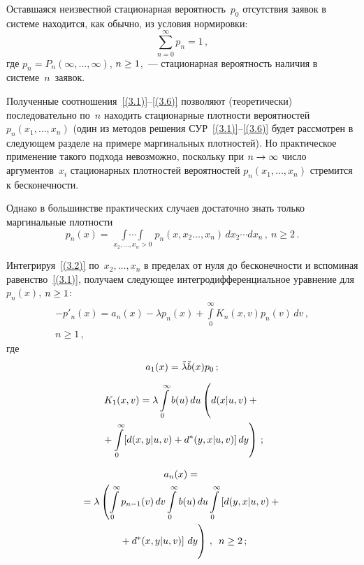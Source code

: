 \begin{multicols}{2}
Оставшаяся неизвестной стационарная
вероятность~$p_0$ отсутствия заявок в системе
находится, как обычно, из условия нормировки:
\begin{equation}
\label{(3.6)}
\sum\limits_{n=0}^\infty p_n = 1\,,
\end{equation}
где
$p_n=P_n(\infty,\ldots,\infty)$, $n\hm\ge1$,~---
стационарная вероятность наличия в системе~$n$~заявок.

Полученные соотношения~\eqref{(3.1)}--\eqref{(3.6)} позволяют
(теоретически) последовательно по~$n$
находить стационарные плотности вероятностей
$p_n(x_1,\ldots,x_{n})$ (один из методов
решения СУР~\eqref{(3.1)}--\eqref{(3.6)}
будет рассмотрен в следующем разделе на примере маргинальных плотностей).
Но практическое применение такого подхода
невозможно, поскольку при $n\hm\to\infty$ число
аргументов~$x_i$ стационарных плотностей
вероятностей $p_n(x_1,\ldots,x_{n})$ стремится к бесконечности.

Однако в большинстве практических случаев
достаточно знать только маргинальные плотности
\begin{equation*}
p_{n}(x) = \mathop{\int\!\cdots\!\int}\limits_{x_2,\ldots,x_n>0}
\!p_{n}(x,x_2\ldots,x_n) \,dx_2\cdots dx_n\,,
\ n\ge 2\,.
\end{equation*}

Интегрируя~\eqref{(3.2)} по~$x_2,\ldots ,x_n$ в пределах от нуля до
бесконечности и вспоминая равенство~\eqref{(3.1)}, получаем следующее
интегродифференциальное уравнение
для $p_{n}(x)$, $n\hm\ge 1$:
\begin{multline}
\label{(3.7)}
-p'_{n}(x) = a_n(x) - \lambda p_{n}(x)
+ \int\limits_0^\infty K_n(x,v) p_{n}(v)\,dv \,,\\ n\ge 1\,,
\end{multline}
где
\begin{equation*}
a_1(x) = \tilde\lambda \tilde b(x) p_0 \,;
\end{equation*}

\vspace*{-12pt}

\noindent
\begin{multline*}
K_1(x,v) = \lambda \int\limits_0^\infty
b(u)\,du \left(\vphantom{\int\limits_0^\infty}
d(x|u,v)
+{}\right.\\
\left.{}+ \int\limits_0^\infty
[d(x,y|u,v) + d^*(y,x|u,v)]\,dy
\right)\,;
\end{multline*}

\vspace*{-12pt}

\noindent
\begin{multline*}
a_{n}(x) = {}\\
{}=\lambda \left(
\int\limits_0^\infty
p_{n-1}(v)\,dv
\int\limits_0^\infty
b(u)\,du
\int\limits_0^\infty
\left[d(y,x|u,v) +{}\right.\right.\\
\left.\left.{}+ d^*(x,y|u,v)\right] \,dy
\vphantom{\int\limits_0^\infty}
\right)\,,\enskip  n\ge 2\,;
\end{multline*}
\vspace*{-12pt}


\end{multicols}
